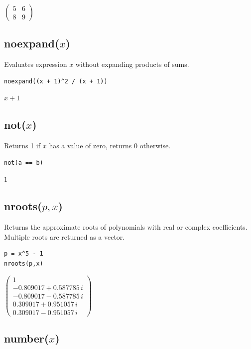 $\displaystyle
\begin{pmatrix}
5 & 6
\\[1ex]
8 & 9
\end{pmatrix}
$

\subsection*{noexpand($x$)}

Evaluates expression $x$ without expanding products of sums.

{\color{blue}
\begin{verbatim}
noexpand((x + 1)^2 / (x + 1))
\end{verbatim}
}

$x + 1$

\subsection*{not($x$)}

Returns 1 if $x$ has a value of zero, returns 0 otherwise.

{\color{blue}
\begin{verbatim}
not(a == b)
\end{verbatim}
}

$1$

\subsection*{nroots($p,x$)}

Returns the approximate roots of polynomials with real or complex coefficients.
Multiple roots are returned as a vector.

{\color{blue}
\begin{verbatim}
p = x^5 - 1
nroots(p,x)
\end{verbatim}
}

$\displaystyle
\begin{pmatrix}
1
\\[1ex]
-0.809017 + 0.587785\,i
\\[1ex]
-0.809017 - 0.587785\,i
\\[1ex]
0.309017 + 0.951057\,i
\\[1ex]
0.309017 - 0.951057\,i
\end{pmatrix}
$

\subsection*{number($x$)}

